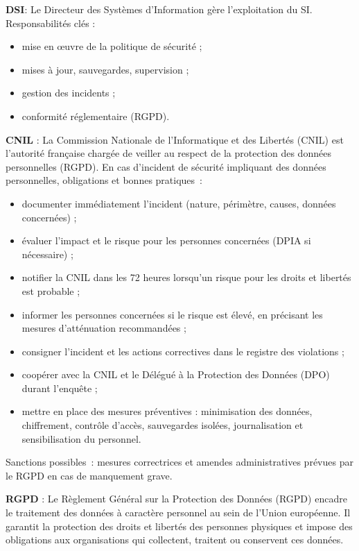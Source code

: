 \vspace{0.5cm}

\noindent \textbf{DSI}:
Le Directeur des Systèmes d'Information gère l'exploitation du SI.  
Responsabilités clés :
\begin{itemize}
    \item mise en œuvre de la politique de sécurité ;
    \item mises à jour, sauvegardes, supervision ;
    \item gestion des incidents ;
    \item conformité réglementaire (RGPD).
\end{itemize}

\noindent \textbf{CNIL} :  
La Commission Nationale de l'Informatique et des Libertés (CNIL) est l'autorité française chargée de veiller au respect de la protection des données personnelles (RGPD). En cas d'incident de sécurité impliquant des données personnelles, obligations et bonnes pratiques :
\begin{itemize}
  \item documenter immédiatement l'incident (nature, périmètre, causes, données concernées) ;
  \item évaluer l'impact et le risque pour les personnes concernées (DPIA si nécessaire) ;
  \item notifier la CNIL dans les 72 heures lorsqu'un risque pour les droits et libertés est probable ;
  \item informer les personnes concernées si le risque est élevé, en précisant les mesures d'atténuation recommandées ;
  \item consigner l'incident et les actions correctives dans le registre des violations ;
  \item coopérer avec la CNIL et le Délégué à la Protection des Données (DPO) durant l'enquête ;
  \item mettre en place des mesures préventives : minimisation des données, chiffrement, contrôle d'accès, sauvegardes isolées, journalisation et sensibilisation du personnel.
\end{itemize}
Sanctions possibles : mesures correctrices et amendes administratives prévues par le RGPD en cas de manquement grave.

\noindent \textbf{RGPD} :  
Le Règlement Général sur la Protection des Données (RGPD) encadre le traitement des données à caractère personnel au sein de l'Union européenne. Il garantit la protection des droits et libertés des personnes physiques et impose des obligations aux organisations qui collectent, traitent ou conservent ces données.

